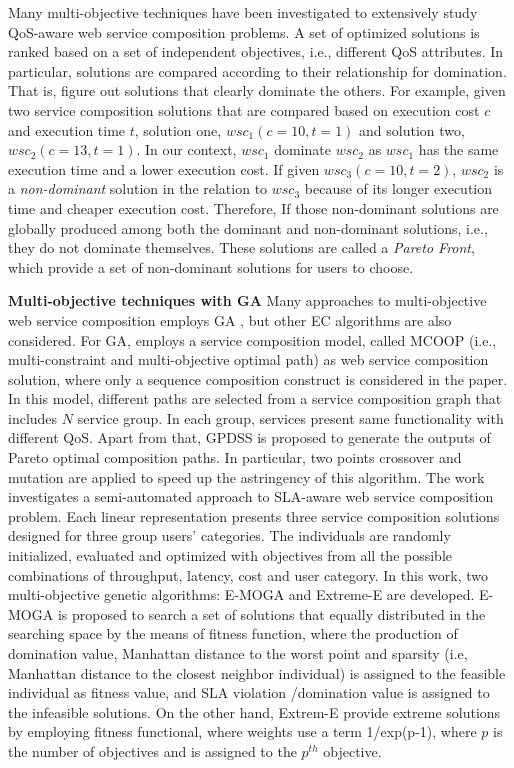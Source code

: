 Many multi-objective techniques \cite{liu2005dynamic,zhang2010qos,yu2013efficient,yin2014hybrid,xiang2014qos,chen2014partial} have been investigated to extensively study QoS-aware web service composition problems.  A set of optimized solutions is ranked based on a set of independent objectives, i.e., different QoS attributes. In particular, solutions are compared according to their relationship for domination. That is, figure out solutions that clearly dominate the others. For example, given two service composition solutions that are compared based on execution cost $c$ and execution time $t$, solution one, $wsc_1(c=10,t=1)$ and solution two,  $wsc_2(c=13,t=1)$. In our context, $wsc_1$ dominate $wsc_2$ as $wsc_1$ has the same execution time and a lower execution cost. If given $wsc_3(c=10,t=2)$, $wsc_2$ is a \textit{non-dominant} solution in the relation to $wsc_3$ because of its longer execution time and cheaper execution cost. Therefore,  If those non-dominant solutions are globally produced among both the dominant and non-dominant solutions, i.e., they do not dominate themselves. These solutions are called a \textit{Pareto Front}, which provide a set of non-dominant solutions for users to choose.


\textbf{Multi-objective techniques with GA} Many approaches to multi-objective web service composition employs GA \cite{liu2005dynamic}, but other EC algorithms are also considered. For GA, \cite{liu2005dynamic} employs a service composition model, called  MCOOP (i.e., multi-constraint and multi-objective optimal path) as web service composition solution, where only a sequence composition construct is considered in the paper. In this model, different paths are selected from a service composition graph that includes $N$ service group. In each group,  services present same functionality with different QoS.  Apart from that, GPDSS is proposed to generate the outputs of Pareto optimal composition paths. In particular, two points crossover and mutation are applied to speed up the astringency of this algorithm. The work \cite{wada2012e3} investigates a semi-automated approach to SLA-aware web service composition problem.  Each linear representation presents three service composition solutions designed for three group users' categories.  The individuals are randomly initialized, evaluated and optimized with objectives from all the possible combinations of throughput, latency, cost and user category.  In this work, two multi-objective genetic algorithms: E-MOGA and Extreme-E are developed. E-MOGA is proposed to search a set of solutions that equally distributed in the searching space by the means of fitness function, where the production of domination value,  Manhattan distance to the worst point and sparsity (i.e, Manhattan distance to the closest neighbor individual)  is assigned to the feasible individual as fitness value, and SLA violation /domination value is assigned to the infeasible solutions. On the other hand, Extrem-E provide extreme solutions by employing fitness functional, where weights use a term 1/exp(p-1), where $p$ is the number of objectives and is assigned to the $p^{th}$ objective.

